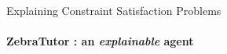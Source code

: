 \documentclass{beamer}
\newcommand{\phantomgraphics}[2][]{%
  \leavevmode\phantom{\texttt{[image: \#2]}}%
}
\begin{document}
\begin{frame}{\small{Explaining Constraint Satisfaction Problems}}
    \framesubtitle{ZebraTutor : an \emph{explainable} agent }
    \vspace{1cm}


\end{frame}
\end{document}
